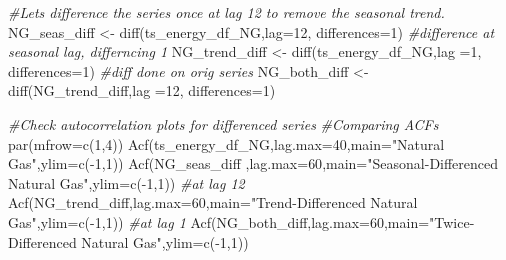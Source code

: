 \documentclass[
]{article}
\newenvironment{Shaded}{\begin{snugshade}}{\end{snugshade}}
\newcommand{\AttributeTok}[1]{\textcolor[rgb]{0.77,0.63,0.00}{#1}}
\newcommand{\CommentTok}[1]{\textcolor[rgb]{0.56,0.35,0.01}{\textit{#1}}}
\newcommand{\DecValTok}[1]{\textcolor[rgb]{0.00,0.00,0.81}{#1}}
\newcommand{\FunctionTok}[1]{\textcolor[rgb]{0.00,0.00,0.00}{#1}}
\newcommand{\NormalTok}[1]{#1}
\newcommand{\OtherTok}[1]{\textcolor[rgb]{0.56,0.35,0.01}{#1}}
\newcommand{\SpecialCharTok}[1]{\textcolor[rgb]{0.00,0.00,0.00}{#1}}
\newcommand{\StringTok}[1]{\textcolor[rgb]{0.31,0.60,0.02}{#1}}
\begin{document}
\begin{Shaded}
\begin{Highlighting}[]
\CommentTok{\#Lets difference the series once at lag 12 to remove the seasonal trend.}
\NormalTok{NG\_seas\_diff }\OtherTok{\textless{}{-}} \FunctionTok{diff}\NormalTok{(ts\_energy\_df\_NG,}\AttributeTok{lag=}\DecValTok{12}\NormalTok{, }\AttributeTok{differences=}\DecValTok{1}\NormalTok{) }\CommentTok{\#difference at seasonal lag, differncing 1}
\NormalTok{NG\_trend\_diff }\OtherTok{\textless{}{-}} \FunctionTok{diff}\NormalTok{(ts\_energy\_df\_NG,}\AttributeTok{lag =}\DecValTok{1}\NormalTok{, }\AttributeTok{differences=}\DecValTok{1}\NormalTok{) }\CommentTok{\#diff done on orig series}
\NormalTok{NG\_both\_diff }\OtherTok{\textless{}{-}} \FunctionTok{diff}\NormalTok{(NG\_trend\_diff,}\AttributeTok{lag =}\DecValTok{12}\NormalTok{, }\AttributeTok{differences=}\DecValTok{1}\NormalTok{)}
\end{Highlighting}
\end{Shaded}

\begin{Shaded}
\begin{Highlighting}[]
\CommentTok{\#Check autocorrelation plots for differenced series}
\CommentTok{\#Comparing ACFs}
\FunctionTok{par}\NormalTok{(}\AttributeTok{mfrow=}\FunctionTok{c}\NormalTok{(}\DecValTok{1}\NormalTok{,}\DecValTok{4}\NormalTok{))}
\FunctionTok{Acf}\NormalTok{(ts\_energy\_df\_NG,}\AttributeTok{lag.max=}\DecValTok{40}\NormalTok{,}\AttributeTok{main=}\StringTok{"Natural Gas"}\NormalTok{,}\AttributeTok{ylim=}\FunctionTok{c}\NormalTok{(}\SpecialCharTok{{-}}\DecValTok{1}\NormalTok{,}\DecValTok{1}\NormalTok{))}
\FunctionTok{Acf}\NormalTok{(NG\_seas\_diff ,}\AttributeTok{lag.max=}\DecValTok{60}\NormalTok{,}\AttributeTok{main=}\StringTok{"Seasonal{-}Differenced Natural Gas"}\NormalTok{,}\AttributeTok{ylim=}\FunctionTok{c}\NormalTok{(}\SpecialCharTok{{-}}\DecValTok{1}\NormalTok{,}\DecValTok{1}\NormalTok{)) }\CommentTok{\#at lag 12}
\FunctionTok{Acf}\NormalTok{(NG\_trend\_diff,}\AttributeTok{lag.max=}\DecValTok{60}\NormalTok{,}\AttributeTok{main=}\StringTok{"Trend{-}Differenced Natural Gas"}\NormalTok{,}\AttributeTok{ylim=}\FunctionTok{c}\NormalTok{(}\SpecialCharTok{{-}}\DecValTok{1}\NormalTok{,}\DecValTok{1}\NormalTok{)) }\CommentTok{\#at lag 1}
\FunctionTok{Acf}\NormalTok{(NG\_both\_diff,}\AttributeTok{lag.max=}\DecValTok{60}\NormalTok{,}\AttributeTok{main=}\StringTok{"Twice{-}Differenced Natural Gas"}\NormalTok{,}\AttributeTok{ylim=}\FunctionTok{c}\NormalTok{(}\SpecialCharTok{{-}}\DecValTok{1}\NormalTok{,}\DecValTok{1}\NormalTok{))}
\end{Highlighting}
\end{Shaded}
\end{document}
